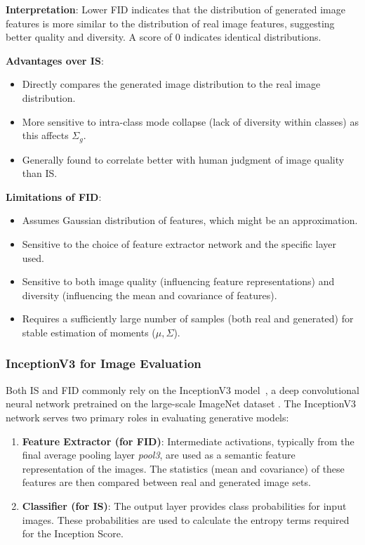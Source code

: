 \noindent\textbf{Interpretation}:
Lower FID indicates that the distribution of generated image features is more similar to the distribution of real image features, suggesting better quality and diversity. A score of 0 indicates identical distributions.

\noindent\textbf{Advantages over IS}:
\begin{itemize}
    \item Directly compares the generated image distribution to the real image distribution.
    \item More sensitive to intra-class mode collapse (lack of diversity within classes) as this affects \(\Sigma_g\).
    \item Generally found to correlate better with human judgment of image quality than IS.
\end{itemize}

\noindent\textbf{Limitations of FID}:
\begin{itemize}
    \item Assumes Gaussian distribution of features, which might be an approximation.
    \item Sensitive to the choice of feature extractor network and the specific layer used.
    \item Sensitive to both image quality (influencing feature representations) and diversity (influencing the mean and covariance of features).
    \item Requires a sufficiently large number of samples (both real and generated) for stable estimation of moments (\(\mu, \Sigma\)).
\end{itemize}

\subsubsection[InceptionV3 Model]{InceptionV3 for Image Evaluation}

Both IS and FID commonly rely on the InceptionV3 model~\cite{szegedy2016rethinking}, a deep convolutional neural network pretrained on the large-scale ImageNet dataset \cite{ImageNetDataset5206848}. The InceptionV3 network serves two primary roles in evaluating generative models:

\begin{enumerate}
    \item \textbf{Feature Extractor (for FID)}: Intermediate activations, typically from the final average pooling layer \textit{pool3}, are used as a semantic feature representation of the images. The statistics (mean and covariance) of these features are then compared between real and generated image sets.
    \item \textbf{Classifier (for IS)}: The output layer provides class probabilities for input images. These probabilities are used to calculate the entropy terms required for the Inception Score.
\end{enumerate}

